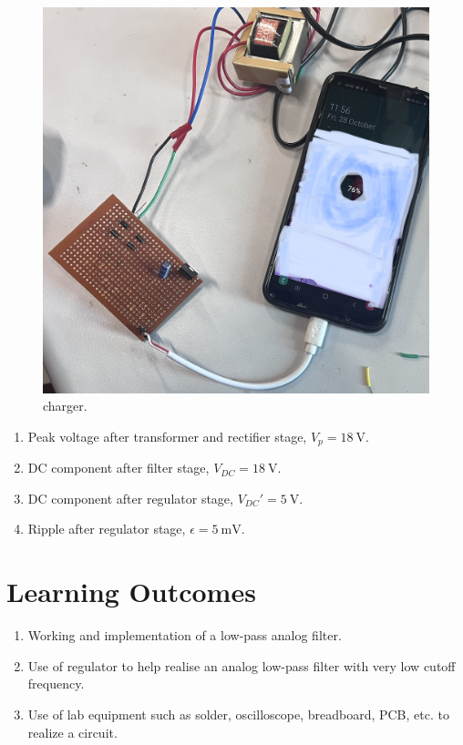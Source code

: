 \documentclass[journal,12pt,twocolumn]{IEEEtran}
\begin{document}
\begin{figure}[!ht]
    \includegraphics[width=\columnwidth]{figs/circuit.jpg}
    \caption{charger.}
    \label{fig:regulator_ac}
\end{figure}

\begin{enumerate}
    \item Peak voltage after transformer and rectifier stage, 
        $V_p = \SI[parse-numbers=false]{18}{\V}$.
    \item DC component after filter stage, 
        $V_{DC} = \SI[parse-numbers=false]{18}{\V}$.
    \item DC component after regulator stage, $V_{DC}' = \SI{5}{\V}$.
    \item Ripple after regulator stage, $\epsilon = \SI{5}{\milli\V}$.
\end{enumerate}

\section{Learning Outcomes}
\begin{enumerate}
    \item Working and implementation of a low-pass analog filter.
    \item Use of regulator to help realise an analog low-pass filter with
        very low cutoff frequency.
    \item Use of lab equipment such as solder, oscilloscope, breadboard, PCB, etc.
        to realize a circuit.
\end{enumerate}
\end{document}
